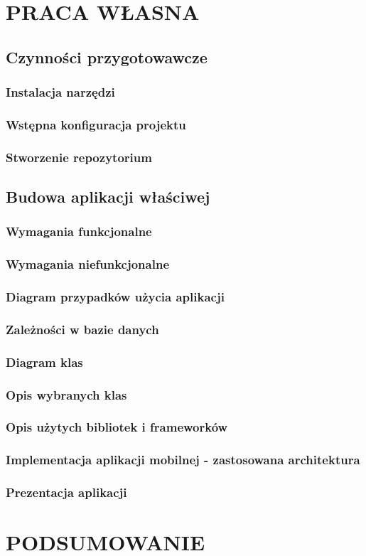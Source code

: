 \documentclass[]{report}
\begin{document}
\chapter{PRACA WŁASNA}
\section{Czynności przygotowawcze}
\subsection{Instalacja narzędzi}
\subsection{Wstępna konfiguracja projektu}
\subsection{Stworzenie repozytorium}
\section{Budowa aplikacji właściwej}
\subsection{Wymagania funkcjonalne}
\subsection{Wymagania niefunkcjonalne}
\subsection{Diagram przypadków użycia aplikacji}
\subsection{Zależności w bazie danych}
\subsection{Diagram klas}
\subsection{Opis wybranych klas}
\subsection{Opis użytych bibliotek i frameworków}
\subsection{Implementacja aplikacji mobilnej - zastosowana architektura}
\subsection{Prezentacja aplikacji}
\chapter{PODSUMOWANIE}
\end{document}
